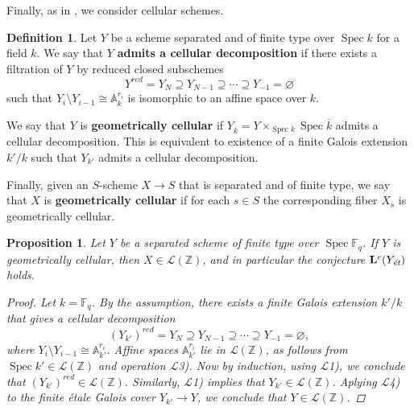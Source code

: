 \documentclass{article}
\DeclareMathOperator{\Spec}{Spec}
\newcommand{\FF}{\mathbb{F}}
\newcommand{\ZZ}{\mathbb{Z}}
\renewcommand{\AA}{\mathbb{A}}
\renewcommand{\emptyset}{\varnothing}
\newcommand{\et}{\text{\it ét}}
\newtheorem{proposition}[theorem]{Proposition}
\theoremstyle{definition}
\newtheorem{definition}[theorem]{Definition}
\numberwithin{equation}{section}
\begin{document}
Finally, as in \cite[\S 5.4]{Morin-2014}, we consider cellular schemes.

\begin{definition}
  Let $Y$ be a scheme separated and of finite type over $\Spec k$ for a field
  $k$. We say that $Y$ \textbf{admits a cellular decomposition} if there exists
  a filtration of $Y$ by reduced closed subschemes
  $$Y^{red} = Y_N \supseteq Y_{N-1} \supseteq \cdots \supseteq Y_{-1} = \emptyset$$
  such that $Y_i\setminus Y_{i-1} \cong \AA^{r_i}_k$ is isomorphic to an affine
  space over $k$.

  We say that $Y$ is \textbf{geometrically cellular} if
  $Y_{\overline{k}} = Y \times_{\Spec k} \Spec \overline{k}$ admits a cellular
  decomposition. This is equivalent to existence of a finite Galois extension
  $k'/k$ such that $Y_{k'}$ admits a cellular decomposition.

  Finally, given an $S$-scheme $X \to S$ that is separated and of finite type,
  we say that $X$ is \textbf{geometrically cellular} if for each $s \in S$ the
  corresponding fiber $X_s$ is geometrically cellular.
\end{definition}

\begin{proposition}
  Let $Y$ be a separated scheme of finite type over $\Spec \FF_q$.
  If $Y$ is geometrically cellular, then $X \in \mathcal{L} (\ZZ)$,
  and in particular the conjecture $\mathbf{L}^c (Y_\et)$ holds.

  \begin{proof}
    Let $k = \FF_q$. By the assumption, there exists a finite Galois extension
    $k'/k$ that gives a cellular decomposition
    $$(Y_{k'})^{red} = Y_N \supseteq Y_{N-1} \supseteq \cdots \supseteq Y_{-1} = \emptyset,$$
    where $Y_i \setminus Y_{i-1} \cong \AA^{r_i}_{k'}$. Affine spaces
    $\AA^{r_i}_{k'}$ lie in $\mathcal{L} (\ZZ)$, as follows from
    $\Spec k' \in \mathcal{L} (\ZZ)$ and operation $\mathcal{L}$3). Now by
    induction, using $\mathcal{L}$1), we conclude that
    $(Y_{k'})^{red} \in \mathcal{L} (\ZZ)$. Similarly, $\mathcal{L}$1) implies
    that $Y_{k'} \in \mathcal{L} (\ZZ)$. Aplying $\mathcal{L}$4) to the finite
    étale Galois cover $Y_{k'} \to Y$, we conclude that
    $Y \in \mathcal{L} (\ZZ)$.
  \end{proof}
\end{proposition}
\end{document}
